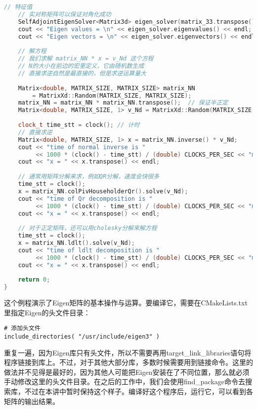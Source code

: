\begin{lstlisting}[language=c++,caption=slambook2/ch3/useEigen/eigenMatrix.cpp]
	// 特征值
	// 实对称矩阵可以保证对角化成功
	SelfAdjointEigenSolver<Matrix3d> eigen_solver(matrix_33.transpose() * matrix_33);
	cout << "Eigen values = \n" << eigen_solver.eigenvalues() << endl;
	cout << "Eigen vectors = \n" << eigen_solver.eigenvectors() << endl;
	
	// 解方程
	// 我们求解 matrix_NN * x = v_Nd 这个方程
	// N的大小在前边的宏里定义，它由随机数生成
	// 直接求逆自然是最直接的，但是求逆运算量大
	
	Matrix<double, MATRIX_SIZE, MATRIX_SIZE> matrix_NN
		= MatrixXd::Random(MATRIX_SIZE, MATRIX_SIZE);
	matrix_NN = matrix_NN * matrix_NN.transpose();  // 保证半正定
	Matrix<double, MATRIX_SIZE, 1> v_Nd = MatrixXd::Random(MATRIX_SIZE, 1);
	
	clock_t time_stt = clock(); // 计时
	// 直接求逆
	Matrix<double, MATRIX_SIZE, 1> x = matrix_NN.inverse() * v_Nd;
	cout << "time of normal inverse is "
	     << 1000 * (clock() - time_stt) / (double) CLOCKS_PER_SEC << "ms" << endl;
	cout << "x = " << x.transpose() << endl;
	
	// 通常用矩阵分解来求，例如QR分解，速度会快很多
	time_stt = clock();
	x = matrix_NN.colPivHouseholderQr().solve(v_Nd);
	cout << "time of Qr decomposition is "
	     << 1000 * (clock() - time_stt) / (double) CLOCKS_PER_SEC << "ms" << endl;
	cout << "x = " << x.transpose() << endl;
	
	// 对于正定矩阵，还可以用cholesky分解来解方程
	time_stt = clock();
	x = matrix_NN.ldlt().solve(v_Nd);
	cout << "time of ldlt decomposition is "
	     << 1000 * (clock() - time_stt) / (double) CLOCKS_PER_SEC << "ms" << endl;
	cout << "x = " << x.transpose() << endl;
	
	return 0;
}
\end{lstlisting}

这个例程演示了Eigen矩阵的基本操作与运算。要编译它，需要在CMakeLists.txt里指定Eigen的头文件目录：
\begin{lstlisting}[caption=slambook2/ch3/useEigen/CMakeLists.txt]
# 添加头文件
include_directories( "/usr/include/eigen3" )
\end{lstlisting}

重复一遍，因为Eigen库只有头文件，所以不需要再用target\_link\_libraries语句将程序链接到库上。不过，对于其他大部分库，多数时候需要用到链接命令。这里的做法并不见得是最好的，因为其他人可能把Eigen安装在了不同位置，那么就必须手动修改这里的头文件目录。在之后的工作中，我们会使用find\_package命令去搜索库，不过在本讲中暂时保持这个样子。编译好这个程序后，运行它，可以看到各矩阵的输出结果。

